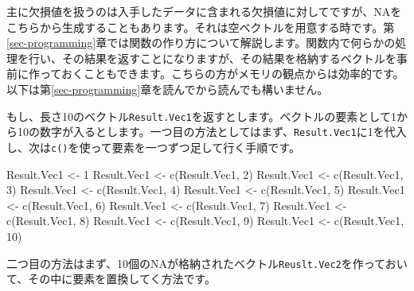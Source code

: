 \documentclass[
  a4paper,
  pandoc,
  ja=standard,
  jafont=haranoaji]{bxjsbook}
\newenvironment{Shaded}{\begin{snugshade}}{\end{snugshade}}
\newcommand{\DecValTok}[1]{\textcolor[rgb]{0.68,0.00,0.00}{#1}}
\newcommand{\FunctionTok}[1]{\textcolor[rgb]{0.28,0.35,0.67}{#1}}
\newcommand{\NormalTok}[1]{\textcolor[rgb]{0.00,0.48,0.65}{#1}}
\newcommand{\OtherTok}[1]{\textcolor[rgb]{0.00,0.48,0.65}{#1}}
\begin{document}
主に欠損値を扱うのは入手したデータに含まれる欠損値に対してですが、NAをこちらから生成することもあります。それは空ベクトルを用意する時です。第\ref{sec-programming}章では関数の作り方について解説します。関数内で何らかの処理を行い、その結果を返すことになりますが、その結果を格納するベクトルを事前に作っておくこともできます。こちらの方がメモリの観点からは効率的です。以下は第\ref{sec-programming}章を読んでから読んでも構いません。

もし、長さ10のベクトル\texttt{Result.Vec1}を返すとします。ベクトルの要素として1から10の数字が入るとします。一つ目の方法としてはまず、\texttt{Result.Vec1}に1を代入し、次は\texttt{c()}を使って要素を一つずつ足して行く手順です。

\begin{Shaded}
\begin{Highlighting}[numbers=left,,]
\NormalTok{Result.Vec1 }\OtherTok{\textless{}{-}} \DecValTok{1}
\NormalTok{Result.Vec1 }\OtherTok{\textless{}{-}} \FunctionTok{c}\NormalTok{(Result.Vec1, }\DecValTok{2}\NormalTok{)}
\NormalTok{Result.Vec1 }\OtherTok{\textless{}{-}} \FunctionTok{c}\NormalTok{(Result.Vec1, }\DecValTok{3}\NormalTok{)}
\NormalTok{Result.Vec1 }\OtherTok{\textless{}{-}} \FunctionTok{c}\NormalTok{(Result.Vec1, }\DecValTok{4}\NormalTok{)}
\NormalTok{Result.Vec1 }\OtherTok{\textless{}{-}} \FunctionTok{c}\NormalTok{(Result.Vec1, }\DecValTok{5}\NormalTok{)}
\NormalTok{Result.Vec1 }\OtherTok{\textless{}{-}} \FunctionTok{c}\NormalTok{(Result.Vec1, }\DecValTok{6}\NormalTok{)}
\NormalTok{Result.Vec1 }\OtherTok{\textless{}{-}} \FunctionTok{c}\NormalTok{(Result.Vec1, }\DecValTok{7}\NormalTok{)}
\NormalTok{Result.Vec1 }\OtherTok{\textless{}{-}} \FunctionTok{c}\NormalTok{(Result.Vec1, }\DecValTok{8}\NormalTok{)}
\NormalTok{Result.Vec1 }\OtherTok{\textless{}{-}} \FunctionTok{c}\NormalTok{(Result.Vec1, }\DecValTok{9}\NormalTok{)}
\NormalTok{Result.Vec1 }\OtherTok{\textless{}{-}} \FunctionTok{c}\NormalTok{(Result.Vec1, }\DecValTok{10}\NormalTok{)}
\end{Highlighting}
\end{Shaded}

二つ目の方法はまず、10個のNAが格納されたベクトル\texttt{Reuslt.Vec2}を作っておいて、その中に要素を置換してく方法です。
\end{document}
